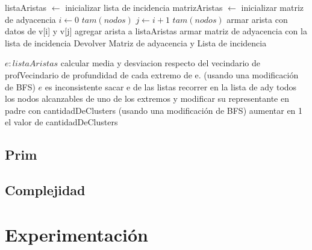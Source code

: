 \documentclass[8pt,a4paper]{article}
\begin{document}
\begin{codebox}
\li listaAristas $\gets$ inicializar lista de incidencia
\li matrizAristas $\gets$ inicializar matriz de adyacencia
\li \For $i \gets 0$ \To $tam(nodos)$
\li 	\Do
\li 		\For  $j \gets i+1$ \To $tam(nodos)$
\li				\Do
					\li armar arista con datos de v[i] y v[j]
					\li agregar arista a listaAristas
				\End
		\End
\li armar matriz de adyacencia con la lista de incidencia
\li Devolver Matriz de adyacencia y Lista de incidencia
\end{codebox}

\begin{codebox}
\li \For $e:listaAristas$
\li 	\Do
			\li calcular media y desviacion respecto del vecindario de profVecindario 
			\zi de profundidad de cada extremo de e. (usando una modificación de BFS)
			\li \If $e$ es inconsistente
				\li \Then
					\li sacar e de las listas
					\li recorrer en la lista de ady todos los nodos alcanzables 
					\zi de uno de los extremos y modificar su representante 
					\zi en padre con cantidadDeClusters (usando una modificación de BFS)
					\li aumentar en 1 el valor de cantidadDeClusters
					\End
		\End
\end{codebox}

\subsection{Prim}

\subsection{Complejidad}

\section{Experimentación}
\end{document}
